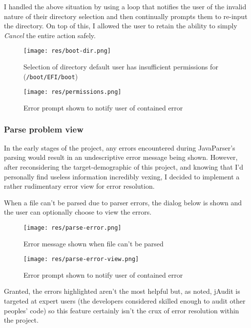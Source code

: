 \documentclass[9pt]{article}
\begin{document}
			I handled the above situation by using a loop that notifies the
			user of the invalid nature of their directory selection and then
			continually prompts them to re-input the directory. On top of this,
			I allowed the user to retain the ability to simply \textit{Cancel}
			the entire action safely.


			\begin{figure}[H]
				\centering
				\texttt{[image: res/boot-dir.png]}
				\caption{Selection of directory default user has insufficient
				permissions for (\texttt{/boot/EFI/boot})}
			\end{figure}

			\begin{figure}[H]
				\centering
				\texttt{[image: res/permissions.png]}
				\caption{Error prompt shown to notify user of contained error}
			\end{figure}

		\subsubsection{Parse problem view}

			In the early stages of the project, any errors encountered during
			JavaParser's parsing would result in an undescriptive error message
			being shown. However, after reconsidering the target-demographic of
			this project, and knowing that I'd personally find useless
			information incredibly vexing, I decided to implement a rather
			rudimentary error view for error resolution.

			When a file can't be parsed due to parser errors, the dialog below is
			shown and the user can optionally choose to view the errors.\\

				\begin{figure}[H]
					\centering
					\texttt{[image: res/parse-error.png]}
					\caption{Error message shown when file can't be parsed}
				\end{figure}

				\begin{figure}[H]
					\centering
					\texttt{[image: res/parse-error-view.png]}
					\caption{Error prompt shown to notify user of contained error}
				\end{figure}
			
			Granted, the errors highlighted aren't the most helpful but, as noted,
			jAudit is targeted at expert users (the developers considered skilled
			enough to audit other peoples' code) so this feature certainly isn't
			the crux of error resolution within the project.
\end{document}

